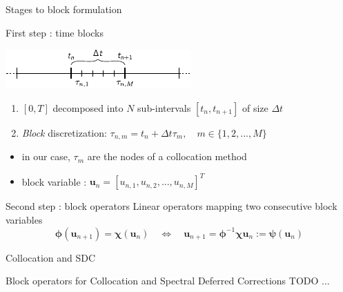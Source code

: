 \documentclass[11pt,aspectratio=43]{beamer}
\newcommand{\vect}[1]{\boldsymbol{#1}}
\newcommand{\uvect}{\vect{u}}
\begin{document}
\begin{frame}{Stages to block formulation}\vskip5pt
    \begin{block}{First step : time blocks}
    	\begin{center}
    		\includegraphics[width=0.7\linewidth]{decompositions.pdf}
    	\end{center}\vskip-10pt
        \begin{enumerate}
            \item $[0,T]$ decomposed into $N$ sub-intervals $[t_n, t_{n+1}]$ of  
            size $\Delta t$
            \item \emph{Block} discretization: $\tau_{n,m} = t_n + \Delta{t}\tau_m,\quad m \in \{1, 2,..., M\}$\\
        \end{enumerate}
    \end{block}
	\begin{itemize}
		\item in our case, $\tau_m$ are the nodes of a collocation method
		\item block variable : $\uvect_n = [u_{n,1}, u_{n,2}, ..., u_{n,M}]^T$
	\end{itemize}\vskip5pt
	\begin{block}{Second step : block operators}
		Linear operators mapping two consecutive block variables\vspace{-10pt}
		$$\bm{\phi}(\uvect_{n+1}) = \bm{\chi}(\uvect_{n})
		\quad\Leftrightarrow\quad 
		\uvect_{n+1} = \bm{\phi}^{-1}\bm{\chi}\uvect_{n}
		:= \bm{\psi}(\uvect_{n})$$
	\end{block}	
\end{frame}

\begin{frame}{Collocation and SDC}\vfill
    \begin{block}{Block operators for Collocation and Spectral Deferred Corrections}
        TODO ...
    \end{block}
\end{frame}
\end{document}
